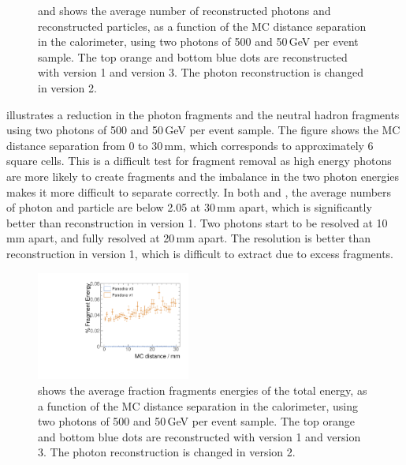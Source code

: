 \begin{figure}[tbph]
\begin{subfigure}[b]{0.45\textwidth}
        \caption{}
        \label{fig:photonDoubleCompareN_all}
    \end{subfigure}
\caption[Average number of reconstructed photons and reconstructed particles, as a function of the MC distance separation.]
{ and  shows the average number of reconstructed photons and reconstructed particles, as a function of the MC distance separation in the calorimeter, using two photons of 500 and 50\,GeV per event sample. The top orange and bottom blue dots are reconstructed with \pandora version 1 and version 3. The photon reconstruction is changed in \pandora version 2.}
\label{fig:photonDoubleCompareN}
\end{figure}

 illustrates a reduction in the photon fragments and the neutral hadron fragments using two photons of 500 and 50\,GeV per event sample. The figure shows the MC distance separation from 0 to 30\,mm, which corresponds to approximately 6 \ECAL square cells. This is a difficult test for fragment removal as high energy photons are more likely to create fragments and the imbalance in the two photon energies makes it more difficult to separate correctly.  In both  and , the average numbers of photon and particle are below 2.05 at 30\,mm apart, which is significantly better than reconstruction in \pandora version 1. Two photons start to be resolved at 10\,mm apart, and fully resolved at 20\,mm apart. The resolution is better than reconstruction in \pandora version 1, which is difficult to extract due to excess fragments.




\begin{figure}[tbph]
\centering
\includegraphics[width=0.45\textwidth]{photon/DoubleCompareFragEnergy.pdf}
\caption[Average fraction fragments energies of the total energy, as a function of the MC distance separation]
{ shows the average fraction fragments energies of the total energy, as a function of the MC distance separation in the calorimeter, using two photons of 500 and 50\,GeV per event sample. The top orange and bottom blue dots are reconstructed with \pandora version 1 and version 3. The photon reconstruction is changed in \pandora version 2.}
\label{fig:photonDoubleFragEnergy}
\end{figure}


